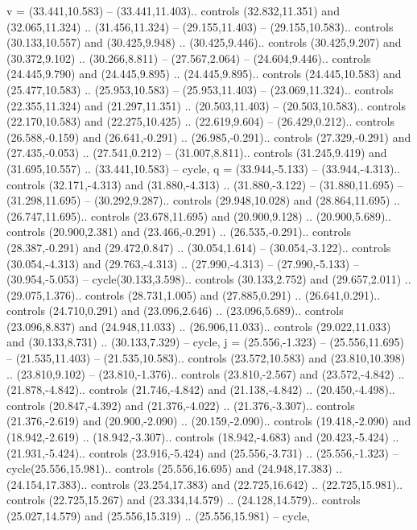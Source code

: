 {v} = {(33.441,10.583) -- (33.441,11.403).. controls (32.832,11.351) and (32.065,11.324) .. (31.456,11.324) -- (29.155,11.403) -- (29.155,10.583).. controls (30.133,10.557) and (30.425,9.948) .. (30.425,9.446).. controls (30.425,9.207) and (30.372,9.102) .. (30.266,8.811) -- (27.567,2.064) -- (24.604,9.446).. controls (24.445,9.790) and (24.445,9.895) .. (24.445,9.895).. controls (24.445,10.583) and (25.477,10.583) .. (25.953,10.583) -- (25.953,11.403) -- (23.069,11.324).. controls (22.355,11.324) and (21.297,11.351) .. (20.503,11.403) -- (20.503,10.583).. controls (22.170,10.583) and (22.275,10.425) .. (22.619,9.604) -- (26.429,0.212).. controls (26.588,-0.159) and (26.641,-0.291) .. (26.985,-0.291).. controls (27.329,-0.291) and (27.435,-0.053) .. (27.541,0.212) -- (31.007,8.811).. controls (31.245,9.419) and (31.695,10.557) .. (33.441,10.583) -- cycle},
{q} = {(33.944,-5.133) -- (33.944,-4.313).. controls (32.171,-4.313) and (31.880,-4.313) .. (31.880,-3.122) -- (31.880,11.695) -- (31.298,11.695) -- (30.292,9.287).. controls (29.948,10.028) and (28.864,11.695) .. (26.747,11.695).. controls (23.678,11.695) and (20.900,9.128) .. (20.900,5.689).. controls (20.900,2.381) and (23.466,-0.291) .. (26.535,-0.291).. controls (28.387,-0.291) and (29.472,0.847) .. (30.054,1.614) -- (30.054,-3.122).. controls (30.054,-4.313) and (29.763,-4.313) .. (27.990,-4.313) -- (27.990,-5.133) -- (30.954,-5.053) -- cycle(30.133,3.598).. controls (30.133,2.752) and (29.657,2.011) .. (29.075,1.376).. controls (28.731,1.005) and (27.885,0.291) .. (26.641,0.291).. controls (24.710,0.291) and (23.096,2.646) .. (23.096,5.689).. controls (23.096,8.837) and (24.948,11.033) .. (26.906,11.033).. controls (29.022,11.033) and (30.133,8.731) .. (30.133,7.329) -- cycle},
{j} = {(25.556,-1.323) -- (25.556,11.695) -- (21.535,11.403) -- (21.535,10.583).. controls (23.572,10.583) and (23.810,10.398) .. (23.810,9.102) -- (23.810,-1.376).. controls (23.810,-2.567) and (23.572,-4.842) .. (21.878,-4.842).. controls (21.746,-4.842) and (21.138,-4.842) .. (20.450,-4.498).. controls (20.847,-4.392) and (21.376,-4.022) .. (21.376,-3.307).. controls (21.376,-2.619) and (20.900,-2.090) .. (20.159,-2.090).. controls (19.418,-2.090) and (18.942,-2.619) .. (18.942,-3.307).. controls (18.942,-4.683) and (20.423,-5.424) .. (21.931,-5.424).. controls (23.916,-5.424) and (25.556,-3.731) .. (25.556,-1.323) -- cycle(25.556,15.981).. controls (25.556,16.695) and (24.948,17.383) .. (24.154,17.383).. controls (23.254,17.383) and (22.725,16.642) .. (22.725,15.981).. controls (22.725,15.267) and (23.334,14.579) .. (24.128,14.579).. controls (25.027,14.579) and (25.556,15.319) .. (25.556,15.981) -- cycle},
